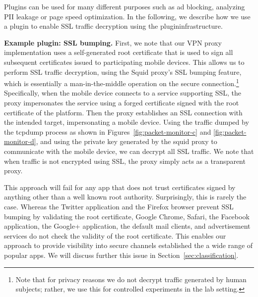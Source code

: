 Plugins can be used for many different purposes such as ad blocking, 
analyzing PII leakage or page speed optimization. In the following, we 
describe how we use a plugin to enable SSL traffic decryption using 
the \platname{} plugininfrastructure. 


\noindent\textbf{Example plugin: SSL bumping.} 
First, we note that our VPN proxy implementation uses a self-generated 
\platname{} root certificate that is used to sign all subsequent certificates 
issued to participating mobile devices. This allows us to perform SSL 
traffic decryption, using the Squid proxy's SSL bumping feature, which is essentially a man-in-the-middle operation 
on the secure connection.\footnote{Note that for privacy reasons we do not 
decrypt traffic generated by human subjects; rather, we use this for controlled 
experiments in the lab setting.} Specifically, when the mobile device connects 
to a service supporting SSL, the proxy impersonates the service using a forged certificate signed
with the root certificate of the \platname{} platform. Then the proxy
establishes an SSL connection with the intended target, impersonating a mobile
device. Using the traffic dumped by the tcpdump process as shown in
Figures~\ref{fig:packet-monitor-c} and \ref{fig:packet-monitor-d}, and
using the private key generated by the squid proxy to communicate with
the mobile device, we can decrypt all SSL traffic. We note that when
traffic is not encrypted using SSL, the proxy simply acts as a
transparent proxy. 

This approach will fail for any app that does not trust certificates 
signed by anything other than a well known root authority. 
Surprisingly, this is rarely the case. Whereas the
Twitter application and the Firefox browser prevent SSL bumping by
validating the root certificate, Google Chrome, Safari, the Facebook
application, the Google+ application, the default mail clients, and
advertisement services do not check the validity of the root
certificate. This enables our approach to provide visibility into 
secure channels established the a wide range of popular apps. We will discuss
further this issue in Section~\ref{sec:classification}. 



